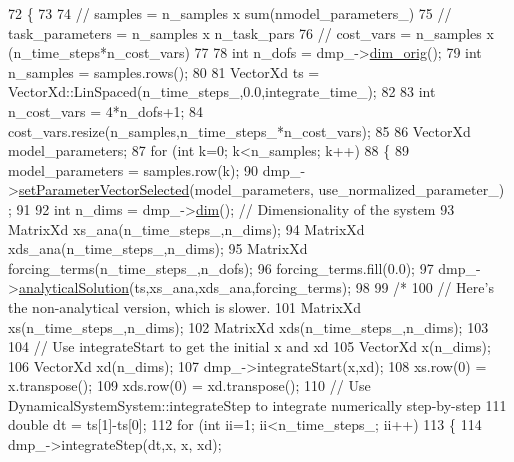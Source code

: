 \begin{DoxyCode}
72 \{
73 
74   \textcolor{comment}{// samples         = n\_samples x sum(nmodel\_parameters\_)}
75   \textcolor{comment}{// task\_parameters = n\_samples x n\_task\_pars}
76   \textcolor{comment}{// cost\_vars       = n\_samples x (n\_time\_steps*n\_cost\_vars)}
77   
78   \textcolor{keywordtype}{int} n\_dofs = dmp\_->\hyperlink{group__DynamicalSystems_ga93d7cbbf2e471b00f124e41706405a05}{dim\_orig}();
79   \textcolor{keywordtype}{int} n\_samples = samples.rows();
80 
81   VectorXd ts = VectorXd::LinSpaced(n\_time\_steps\_,0.0,integrate\_time\_);
82   
83   \textcolor{keywordtype}{int} n\_cost\_vars = 4*n\_dofs+1;
84   cost\_vars.resize(n\_samples,n\_time\_steps\_*n\_cost\_vars); 
85     
86   VectorXd model\_parameters;
87   \textcolor{keywordflow}{for} (\textcolor{keywordtype}{int} k=0; k<n\_samples; k++)
88   \{
89     model\_parameters = samples.row(k);
90     dmp\_->\hyperlink{classDmpBbo_1_1Parameterizable_aee501e63a46d63eb58a6f271bf093b9d}{setParameterVectorSelected}(model\_parameters, use\_normalized\_parameter\_)
      ;
91     
92     \textcolor{keywordtype}{int} n\_dims = dmp\_->\hyperlink{group__DynamicalSystems_ga6f628f7f4ed9d77bf69f5b8560b98f18}{dim}(); \textcolor{comment}{// Dimensionality of the system}
93     MatrixXd xs\_ana(n\_time\_steps\_,n\_dims);
94     MatrixXd xds\_ana(n\_time\_steps\_,n\_dims);
95     MatrixXd forcing\_terms(n\_time\_steps\_,n\_dofs);
96     forcing\_terms.fill(0.0);
97     dmp\_->\hyperlink{classDmpBbo_1_1Dmp_ad62585b1e0bab2b9743782e15e01d694}{analyticalSolution}(ts,xs\_ana,xds\_ana,forcing\_terms);
98 
99     \textcolor{comment}{/*    }
100 \textcolor{comment}{    // Here's the non-analytical version, which is slower.}
101 \textcolor{comment}{    MatrixXd xs(n\_time\_steps\_,n\_dims);}
102 \textcolor{comment}{    MatrixXd xds(n\_time\_steps\_,n\_dims);}
103 \textcolor{comment}{    }
104 \textcolor{comment}{    // Use integrateStart to get the initial x and xd}
105 \textcolor{comment}{    VectorXd x(n\_dims);}
106 \textcolor{comment}{    VectorXd xd(n\_dims);}
107 \textcolor{comment}{    dmp\_->integrateStart(x,xd);}
108 \textcolor{comment}{    xs.row(0)  = x.transpose();}
109 \textcolor{comment}{    xds.row(0)  = xd.transpose();}
110 \textcolor{comment}{    // Use DynamicalSystemSystem::integrateStep to integrate numerically step-by-step}
111 \textcolor{comment}{    double dt = ts[1]-ts[0];}
112 \textcolor{comment}{    for (int ii=1; ii<n\_time\_steps\_; ii++)}
113 \textcolor{comment}{    \{}
114 \textcolor{comment}{      dmp\_->integrateStep(dt,x,           x,          xd); }

\end{DoxyCode}
